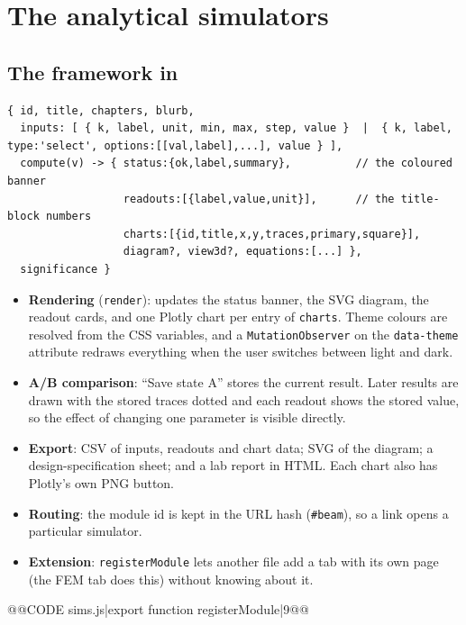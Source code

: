 \chapter{The analytical simulators}
\label{ch:sims}

\section{The framework in }

\begin{Verbatim}[fontsize=\fontsize{6.6}{8}\selectfont,frame=lines,rulecolor=\color{gray!60}]
{ id, title, chapters, blurb,
  inputs: [ { k, label, unit, min, max, step, value }  |  { k, label, type:'select', options:[[val,label],...], value } ],
  compute(v) -> { status:{ok,label,summary},          // the coloured banner
                  readouts:[{label,value,unit}],      // the title-block numbers
                  charts:[{id,title,x,y,traces,primary,square}],
                  diagram?, view3d?, equations:[...] },
  significance }
\end{Verbatim}
\begin{itemize}[nosep]
\item \textbf{Rendering} (\texttt{render}): updates the status banner, the SVG diagram, the readout cards, and one Plotly chart per entry of \texttt{charts}. Theme colours are resolved from the CSS variables, and a \texttt{MutationObserver} on the \texttt{data-theme} attribute redraws everything when the user switches between light and dark.
\item \textbf{A/B comparison}: ``Save state A'' stores the current result. Later results are drawn with the stored traces dotted and each readout shows the stored value, so the effect of changing one parameter is visible directly.
\item \textbf{Export}: CSV of inputs, readouts and chart data; SVG of the diagram; a design-specification sheet; and a lab report in HTML. Each chart also has Plotly's own PNG button.
\item \textbf{Routing}: the module id is kept in the URL hash (\texttt{\#beam}), so a link opens a particular simulator.
\item \textbf{Extension}: \texttt{registerModule} lets another file add a tab with its own page (the FEM tab does this) without  knowing about it.
\end{itemize}
@@CODE sims.js|export function registerModule|9@@

